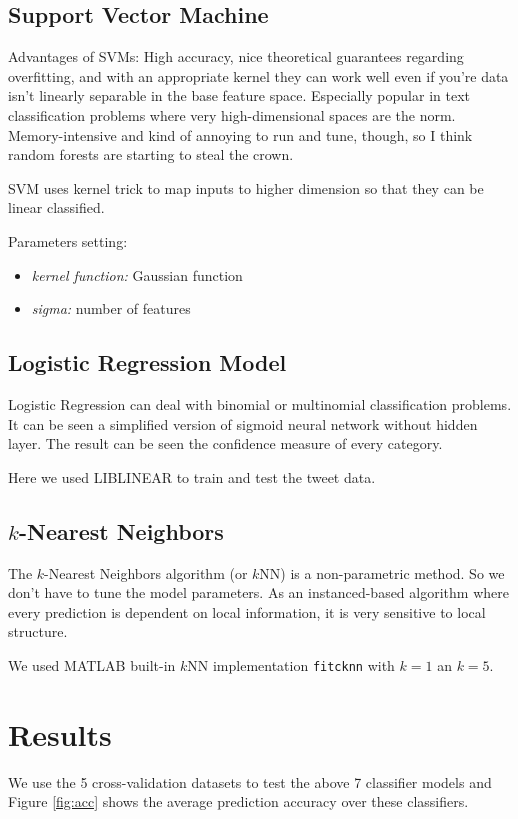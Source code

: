 \documentclass[letterpaper,11pt,twocolumn]{article}
\begin{document}
\subsection{Support Vector Machine}
Advantages of SVMs: High accuracy, nice theoretical guarantees regarding overfitting, and with an appropriate kernel they can work well even if you're data isn't linearly separable in the base feature space. Especially popular in text classification problems where very high-dimensional spaces are the norm. Memory-intensive and kind of annoying to run and tune, though, so I think random forests are starting to steal the crown.

SVM uses kernel trick to map inputs to higher dimension so that they can be linear classified.

Parameters setting:
\begin{itemize} 
\item \emph{kernel function:} Gaussian function
\item \emph{sigma:} number of features
\end{itemize}

\subsection{Logistic Regression Model}
Logistic Regression can deal with binomial or multinomial classification problems. It can be seen a simplified version of sigmoid neural network without hidden layer. The result can be seen the confidence measure of every category.

Here we used LIBLINEAR to train and test the tweet data.

\subsection{$k$-Nearest Neighbors}
The $k$-Nearest Neighbors algorithm (or $k$NN) is a non-parametric method. So we don't have to tune the model parameters. As an instanced-based algorithm where every prediction is dependent on local information, it is very sensitive to local structure.

We used MATLAB built-in $k$NN implementation \texttt{fitcknn} with $k = 1$ an $k = 5$.

\section{Results}
\label{sec:resu}
We use the 5 cross-validation datasets to test the above 7 classifier models and Figure \ref{fig:acc} shows the average prediction accuracy over these classifiers.
\end{document}
